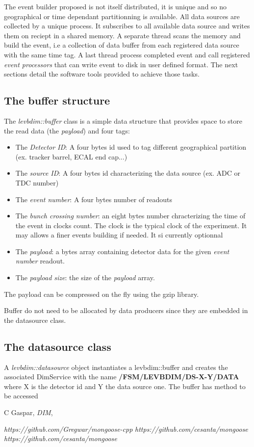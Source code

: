 \documentclass[11pt]{article}
\begin{document}
The event builder proposed is not itself distributed, it is unique and so no geographical or time dependant partitionning is available. All data sources are collected by a unique process. It subscribes to all available data source and writes them on reciept in a shared memory. A separate thread scans the memory and build the event, i.e a collection of data buffer from each registered data source with the same time tag. A last thread process completed event and call registered \emph{event processors} that can write event to disk in user defined format. The next sections detail the software tools provided to achieve those tasks.
\subsection{The buffer structure}
The \emph{levbdim::buffer} class is a simple data structure that provides space to store the read data (the \emph{payload}) and four tags:
\begin{itemize}
\item The \emph{Detector ID}: A four bytes id used to tag different geographical partition (ex. tracker barrel, ECAL end cap...)

\item The \emph{source ID}: A four bytes id characterizing the data source (ex. ADC or TDC number)
\item The \emph{event number}: A four bytes number of readouts
 
 \item The \emph{bunch crossing number}: an eight bytes number chracterizing the time of the event in clocks count. The clock is the typical clock of the experiment. It may allows a finer events building if needed. It si currently optionnal
 
 \item The \emph{payload}: a bytes array containing detector data for the given \emph{event number} readout. 
 
 \item The \emph{payload size}: the size of the \emph{payload} array.
\end{itemize}

The payload can be compressed on the fly using the gzip\cite{gzip} library.

Buffer do not need to be allocated by data producers since they are embedded in the datasource class.
\subsection{The datasource class}
A \emph{levbdim::datasource} object instantiates a {levbdim::buffer} and creates the associated DimService with the name {\bf /FSM/LEVBDIM/DS-X-Y/DATA}  where X is the detector id and Y the data source one. The buffer has method to be accessed
\begin{thebibliography}{9}

  C Gaspar,
  \emph{DIM},
  
\emph{https://github.com/Gregwar/mongoose-cpp}
\emph{https://github.com/cesanta/mongoose}
\emph{https://github.com/cesanta/mongoose}
\end{thebibliography}
\end{document}
